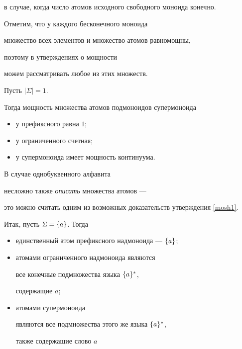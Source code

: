  в случае, когда число атомов исходного свободного моноида конечно.


 Отметим, что у каждого бесконечного моноида


 множество всех элементов и множество атомов равномощны,


 поэтому в утверждениях о мощности


можем рассматривать любое из этих множеств.





 \begin{props} \label{mosh1}


 Пусть $|\Sigma|=1$.


 Тогда мощность множества атомов подмоноидов супермоноида


 \begin{itemize}


\item[--] у префиксного равна $1;$


\item[--] у ограниченного счетная$;$


\item[--] у супермоноида имеет мощность континуума.


 \end{itemize}


 \end{props}





 В случае однобуквенного алфавита


 несложно также {\it описать} множества атомов ---


 это можно считать одним из возможных доказательств утверждения \ref{mosh1}.


 Итак, пусть $\Sigma=\{ a \}$. Тогда


 \begin{itemize}


\item[--] единственный атом префиксного надмоноида --- $\{ a \}$;


\item[--] атомами ограниченного надмоноида являются


все конечные подмножества языка $\{ a \}^*$,


содержащие $a$;


\item[--] атомами супермоноида


являются все подмножества этого же языка $\{ a \}^*$,


также содержащие слово $a$


 \end{itemize}


